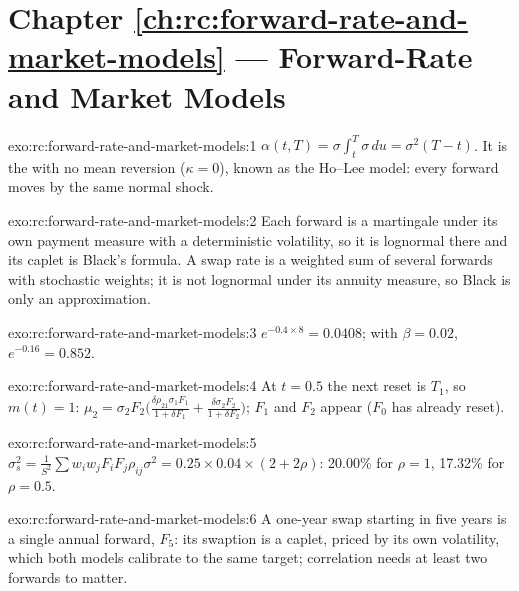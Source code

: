 \section*{Chapter \ref{ch:rc:forward-rate-and-market-models} --- Forward-Rate and Market Models}

\begin{solution}{exo:rc:forward-rate-and-market-models:1}
$\alpha(t,T) = \sigma\int_t^T\sigma\,du = \sigma^2(T-t)$. It is the  with
no mean reversion ($\kappa=0$), known as the Ho--Lee model: every forward moves by
the same normal shock.
\end{solution}

\begin{solution}{exo:rc:forward-rate-and-market-models:2}
Each forward is a martingale under its own payment measure with a deterministic
volatility, so it is lognormal there and its caplet is Black's formula. A swap
rate is a weighted sum of several forwards with stochastic weights; it is not
lognormal under its annuity measure, so Black is only an approximation.
\end{solution}

\begin{solution}{exo:rc:forward-rate-and-market-models:3}
$e^{-0.4\times8} = 0.0408$; with $\beta=0.02$, $e^{-0.16} = 0.852$.
\end{solution}

\begin{solution}{exo:rc:forward-rate-and-market-models:4}
At $t=0.5$ the next reset is $T_1$, so $m(t)=1$:
$\mu_2 = \sigma_2F_2\bigl(\frac{\delta\rho_{21}\sigma_1F_1}{1+\delta F_1}+\frac{\delta\sigma_2F_2}{1+\delta F_2}\bigr)$;
$F_1$ and $F_2$ appear ($F_0$ has already reset).
\end{solution}

\begin{solution}{exo:rc:forward-rate-and-market-models:5}
$\sigma_s^2 = \frac{1}{S^2}\sum w_iw_jF_iF_j\rho_{ij}\sigma^2 = 0.25\times0.04\times(2+2\rho)$:
20.00\% for $\rho=1$, 17.32\% for $\rho=0.5$.
\end{solution}

\begin{solution}{exo:rc:forward-rate-and-market-models:6}
A one-year swap starting in five years is a single annual forward, $F_5$: its
swaption is a caplet, priced by its own volatility, which both models calibrate
to the same target; correlation needs at least two forwards to matter.
\end{solution}

